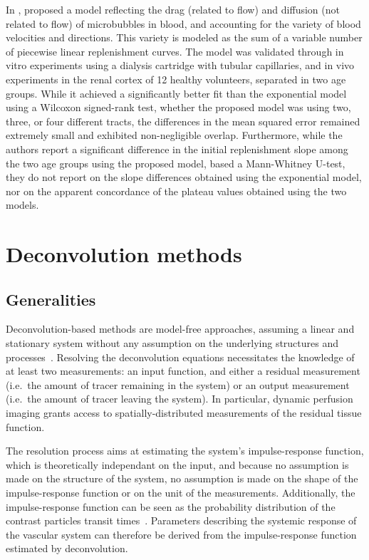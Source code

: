 In \citeyear{Quaia:2009fs}, \citet{Quaia:2009fs} proposed a model reflecting the drag (related to flow) and diffusion (not related to flow) of microbubbles in blood, and accounting for the variety of blood velocities and directions. %
This variety is modeled as the sum of a variable number of piecewise linear replenishment curves.
The model was validated through in vitro experiments using a dialysis cartridge with tubular capillaries, and in vivo experiments in the renal cortex of 12 healthy volunteers, separated in two age groups. 
While it achieved a significantly better fit than the exponential model using a Wilcoxon signed-rank test, whether the proposed model was using two, three, or four different tracts, the differences in the mean squared error remained extremely small and exhibited non-negligible overlap.
Furthermore, while the authors report a significant difference in the initial replenishment slope among the two age groups using the proposed model, based a Mann-Whitney U-test, they do not report on the slope differences obtained using the exponential model, nor on the apparent concordance of the plateau values obtained using the two models.

\section{Deconvolution methods}
\label{sec:DeconvolutionMethods}
\subsection{Generalities}
Deconvolution-based methods are model-free approaches, assuming a linear and stationary system without any assumption on the underlying structures and processes~\cite{Lassen:1979tk}.
Resolving the deconvolution equations necessitates the knowledge of at least two measurements: an input function, and either a residual measurement (i.e.~the amount of tracer remaining in the system) or an output measurement (i.e.~the amount of tracer leaving the system).
In particular, dynamic perfusion imaging grants access to spatially-distributed measurements of the residual tissue function.

The resolution process aims at estimating the system's impulse-response function, which is theoretically independant on the input, and because no assumption is made on the structure of the system, no assumption is made on the shape of the impulse-response function or on the unit of the measurements.
Additionally, the impulse-response function can be seen as the probability distribution of the contrast particles transit times~\cite{Lassen:1979vj}.
Parameters describing the systemic response of the vascular system can therefore be derived from the impulse-response function estimated by deconvolution.

